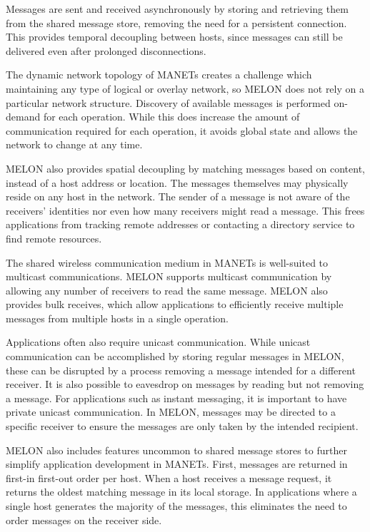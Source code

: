 \documentclass[lnicst]{svmultln}
\begin{document}
Messages are sent and received asynchronously by storing and retrieving them from the shared message store, removing the need for a persistent connection. This provides temporal decoupling between hosts, since messages can still be delivered even after prolonged disconnections.

The dynamic network topology of MANETs creates a challenge which maintaining any type of logical or overlay network, so MELON does not rely on a particular network structure. Discovery of available messages is performed on-demand for each operation. While this does increase the amount of communication required for each operation, it avoids global state and allows the network to change at any time.

MELON also provides spatial decoupling by matching messages based on content, instead of a host address or location. The messages themselves may physically reside on any host in the network. The sender of a message is not aware of the receivers' identities nor even how many receivers might read a message. This frees applications from tracking remote addresses or contacting a directory service to find remote resources.

The shared wireless communication medium in MANETs is well-suited to multicast communications. MELON supports multicast communication by allowing any number of receivers to read the same message. MELON also provides bulk receives, which allow applications to efficiently receive multiple messages from multiple hosts in a single operation.

Applications often also require unicast communication. While unicast communication can be accomplished by storing regular messages in MELON, these can be disrupted by a process removing a message intended for a different receiver. It is also possible to eavesdrop on messages by reading but not removing a message. For applications such as instant messaging, it is important to have private unicast communication. In MELON, messages may be directed to a specific receiver to ensure the messages are only taken by the intended recipient.

MELON also includes features uncommon to shared message stores to further simplify application development in MANETs. First, messages are returned in first-in first-out order per host. When a host receives a message request, it returns the oldest matching message in its local storage. In applications where a single host generates the majority of the messages, this eliminates the need to order messages on the receiver side. 
\end{document}
